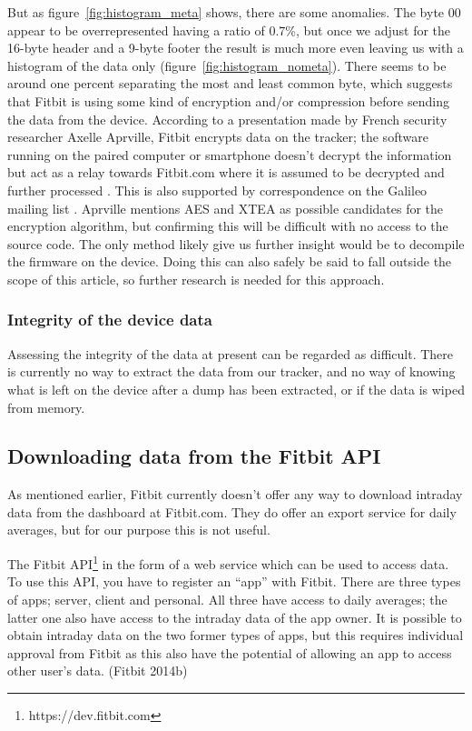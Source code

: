 \documentclass[a4paper,11pt,dvips]{article}
\begin{document}
But as figure~\ref{fig:histogram_meta} shows, there are some anomalies. The byte 00 appear to be overrepresented having a ratio of 0.7\%, but once we adjust for the 16-byte header and a 9-byte footer the result is much more even leaving us with a histogram of the data only (figure~\ref{fig:histogram_nometa}). There seems to be around one percent separating the most and least common byte, which suggests that Fitbit is using some kind of encryption and/or compression before sending the data from the device. According to a presentation made by French security researcher Axelle Aprville, Fitbit encrypts data on the tracker; the software running on the paired computer or smartphone doesn't decrypt the information but act as a relay towards Fitbit.com where it is assumed to be decrypted and further processed \citep{Aprville:2015a}. This is also supported by correspondence on the Galileo mailing list \citep{Allard:2014b}. Aprville mentions AES and XTEA as possible candidates for the encryption algorithm, but confirming this will be difficult with no access to the source code. The only method likely give us further insight would be to decompile the firmware on the device. Doing this can also safely be said to fall outside the scope of this article, so further research is needed for this approach.

\subsubsection{Integrity of the device data}
Assessing the integrity of the data at present can be regarded as difficult. There is currently no way to extract the data from our tracker, and no way of knowing what is left on the device after a dump has been extracted, or if the data is wiped from memory.


\subsection{Downloading data from the Fitbit API}
As mentioned earlier, Fitbit currently doesn't offer any way to download intraday data from the dashboard at Fitbit.com. They do offer an export service for daily averages, but for our purpose this is not useful.

The Fitbit API\footnote{https://dev.fitbit.com} in the form of a web service which can be used to access data. To use this API, you have to register an “app” with Fitbit. There are three types of apps; server, client and personal. All three have access to daily averages; the latter one also have access to the intraday data of the app owner. It is possible to obtain intraday data on the two former types of apps, but this requires individual approval from Fitbit as this also have the potential of allowing an app to access other user's data. (Fitbit 2014b)
\end{document}
